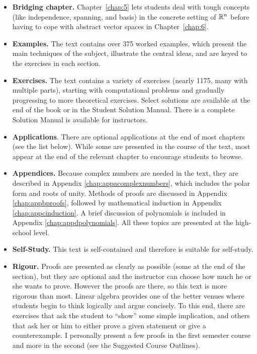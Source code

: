\begin{itemize}
\item \textbf{Bridging chapter.} Chapter~\ref{chap:5} lets students deal with tough concepts (like independence, spanning, and basis) in the concrete setting of $\mathbb{R}^n$ before having to cope with abstract vector spaces in Chapter~\ref{chap:6}.

\item \textbf{Examples.}
 The text contains over 375 worked examples, which present the main 
techniques of the subject, illustrate the central ideas, and are keyed 
to the exercises in each section.

\item \textbf{Exercises.}
 The text contains a variety of exercises (nearly 1175, many with 
multiple parts), starting with computational problems and gradually 
progressing to more theoretical exercises. Select solutions are available at the end of the book or in the Student Solution Manual. There is a complete Solution Manual is 
available for instructors.

\item \textbf{Applications}.
 There are optional applications at the end of most chapters (see the 
list below). While some are presented in the course of the text, most 
appear at the end of the relevant chapter to encourage students to 
browse.

\item \textbf{Appendices.} Because complex numbers are needed in the text, they are described in Appendix \ref{chap:appacomplexnumbers}, which includes the polar form and roots of unity. Methods of proofs are discussed in Appendix \ref{chap:appbproofs}, followed by mathematical induction in Appendix \ref{chap:appcinduction}. A brief discussion of polynomials is included in Appendix \ref{chap:appdpolynomials}. All these topics are presented at the high-school level.

\item \textbf{Self-Study.} This text is self-contained and therefore is suitable for self-study.

\item \textbf{Rigour.}
 Proofs are presented as clearly as possible (some at the end of the 
section), but they are optional and the instructor can choose how much 
he or she wants to prove. However the proofs are there, so this text is 
more rigorous than most. Linear algebra provides one of the better 
venues where students begin to think logically and argue concisely. To 
this end, there are exercises that ask the student to ``show'' some simple
 implication, and others that ask her or him to either prove a given 
statement or give a counterexample. I personally present a few proofs in
 the first semester course and more in the second (see the Suggested 
Course Outlines).


\end{itemize}

